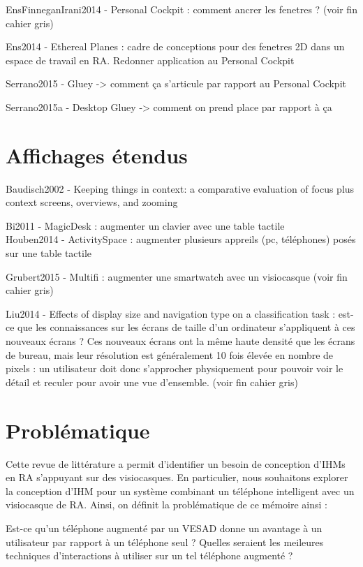 EnsFinneganIrani2014 - Personal Cockpit : comment ancrer les fenetres ? (voir fin cahier gris)

Ens2014 - Ethereal Planes : cadre de conceptions pour des fenetres 2D dans un espace de travail en RA. Redonner application au Personal Cockpit

Serrano2015 - Gluey -> comment ça s'articule par rapport au Personal Cockpit

Serrano2015a - Desktop Gluey -> comment on prend place par rapport à ça


\section{Affichages étendus}
Baudisch2002 - Keeping things in context: a comparative evaluation of focus plus context screens, overviews, and zooming

Bi2011 - MagicDesk : augmenter un clavier avec une table tactile\\
Houben2014 - ActivitySpace : augmenter plusieurs appreils (pc, téléphones) posés sur une table tactile

Grubert2015 - Multifi : augmenter une smartwatch avec un visiocasque (voir fin cahier gris)

Liu2014 - Effects of display size and navigation type on a classification task : est-ce que les connaissances sur les écrans de taille d'un ordinateur s'appliquent à ces nouveaux écrans ? Ces nouveaux écrans ont la même haute densité que les écrans de bureau, mais leur résolution est généralement 10 fois élevée en nombre de pixels : un utilisateur doit donc s'approcher physiquement pour pouvoir voir le détail et reculer pour avoir une vue d'ensemble. (voir fin cahier gris)


\section{Problématique}
Cette revue de littérature a permit d'identifier un besoin de conception d'IHMs en RA s'appuyant sur des visiocasques. En particulier, nous souhaitons explorer la conception d'IHM pour un système combinant un téléphone intelligent avec un visiocasque de RA. Ainsi, on définit la problématique de ce mémoire ainsi :

\begin{displayquote}
  Est-ce qu'un téléphone augmenté par un VESAD donne un avantage à un utilisateur par rapport à un téléphone seul ? Quelles seraient les meileures techniques d'interactions à utiliser sur un tel téléphone augmenté ?
\end{displayquote}

